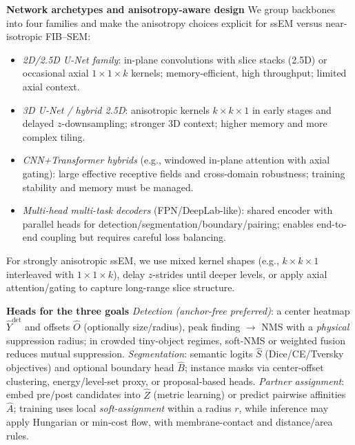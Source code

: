 \medskip
\noindent\textbf{Network archetypes and anisotropy-aware design}\;
We group backbones into four families and make the anisotropy choices explicit for ssEM versus near-isotropic FIB--SEM:
\begin{itemize}
  \item \emph{2D/2.5D U-Net family}: in-plane convolutions with slice stacks (2.5D) or occasional axial \(1\times 1\times k\) kernels; memory-efficient, high throughput; limited axial context.
  \item \emph{3D U-Net / hybrid 2.5D}: anisotropic kernels \(k\times k\times 1\) in early stages and delayed \(z\)-downsampling; stronger 3D context; higher memory and more complex tiling.
  \item \emph{CNN+Transformer hybrids} (e.g., windowed in-plane attention with axial gating): large effective receptive fields and cross-domain robustness; training stability and memory must be managed.
  \item \emph{Multi-head multi-task decoders} (FPN/DeepLab-like): shared encoder with parallel heads for detection/segmentation/boundary/pairing; enables end-to-end coupling but requires careful loss balancing.
\end{itemize}
For strongly anisotropic ssEM, we use mixed kernel shapes (e.g., \(k\times k\times 1\) interleaved with \(1\times 1\times k\)), delay \(z\)-strides until deeper levels, or apply axial attention/gating to capture long-range slice structure.\par

\medskip
\noindent\textbf{Heads for the three goals}\;
\emph{Detection (anchor-free preferred)}: a center heatmap \(\hat{Y}^{\mathrm{det}}\) and offsets \(\hat{O}\) (optionally size/radius), peak finding \(\rightarrow\) NMS with a \emph{physical} suppression radius; in crowded tiny-object regimes, soft-NMS or weighted fusion reduces mutual suppression.
\emph{Segmentation}: semantic logits \(\hat{S}\) (Dice/CE/Tversky objectives) and optional boundary head \(\hat{B}\); instance masks via center-offset clustering, energy/level-set proxy, or proposal-based heads.
\emph{Partner assignment}: embed pre/post candidates into \(\hat{Z}\) (metric learning) or predict pairwise affinities \(\hat{A}\); training uses local \emph{soft-assignment} within a radius \(r\), while inference may apply Hungarian or min-cost flow, with membrane-contact and distance/area rules.\par

